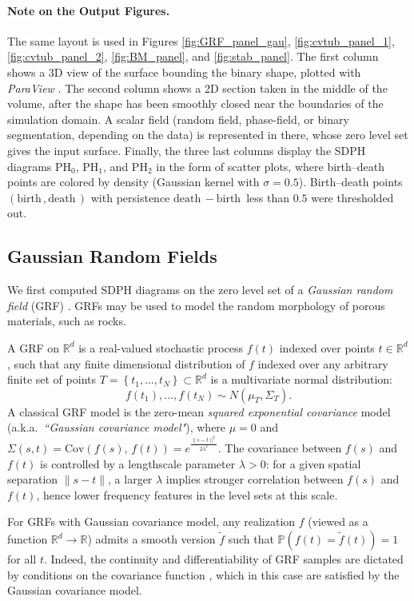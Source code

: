\documentclass[11pt]{article}
\newcommand{\R}{\mathbb{R}}
\newcommand{\PH}{\mathrm{PH}}
\newcommand{\birth}{\mathrm{birth} \,}
\newcommand{\death}{\mathrm{death} \,}
\theoremstyle{plain}
\theoremstyle{definition}
\theoremstyle{remark}
\begin{document}
\paragraph{Note on the Output Figures.}
The same layout is used in Figures \ref{fig:GRF_panel_gau}, \ref{fig:cvtub_panel_1}, \ref{fig:cvtub_panel_2}, \ref{fig:BM_panel}, and \ref{fig:stab_panel}.
The first column shows a 3D view of the surface bounding the binary shape, plotted with \textit{ParaView} \citep{ayachit_paraview_2015}. The second column shows a 2D section taken in the middle of the volume, after the shape has been smoothly closed near the boundaries of the simulation domain. A scalar field (random field, phase-field, or binary segmentation, depending on the data) is represented in there, whose zero level set gives the input surface. Finally, the three last columns display the SDPH diagrams $\PH_0$, $\PH_1$, and $\PH_2$ in the form of scatter plots, where birth--death points are colored by density (Gaussian kernel with $\sigma = 0.5$). Birth--death points $(\birth,\death)$ with persistence $\death - \birth$ less than $0.5$ were thresholded out.

\subsection{Gaussian Random Fields}
\label{sec:GRF_applis}
We first computed SDPH diagrams on the zero level set of a \textit{Gaussian random field} (GRF) \citep{adler_geometry_2010, gaetan_spatial_2010}. GRFs may be used to model the random morphology of porous materials, such as rocks.

A GRF on $\mathbb{R}^d$ is a real-valued stochastic process $f(t)$ indexed over points $t \in \mathbb{R}^d$, such that any finite dimensional distribution of $f$ indexed over any arbitrary finite set of points $T = \left\{t_1, \ldots, t_N\right\} \subset \mathbb{R}^d$ is a multivariate normal distribution:
$$f(t_1), \ldots, f(t_N) \sim N(\mu_T, \Sigma_{T}).$$
A classical GRF model is the zero-mean \emph{squared exponential covariance} model (a.k.a.~\textit{``Gaussian covariance model"}), where $\mu = 0$ and $\Sigma(s,t) = \mathrm{Cov}\left(f(s),\, f(t)\right) = e^{\frac{\|s-t\|^2}{2\lambda^2}}.$
The covariance between $f(s)$ and $f(t)$ is controlled by a lengthscale parameter $\lambda > 0$: for a given spatial separation $\| s-t \|$, a larger $\lambda$ implies stronger correlation between $f(s)$ and $f(t)$, hence lower frequency features in the level sets at this scale.

For GRFs with Gaussian covariance model, any realization $f$ (viewed as a function $\R^d \to \R$) admits a smooth version $\tilde{f}$ such that $\mathbb{P}(f(t) = \tilde{f}(t)) = 1$ for all $t$. Indeed, the continuity and differentiability of GRF samples are dictated by conditions on the covariance function \citep[Theorem 3.4.1]{adler_geometry_2010}, which in this case are satisfied by the Gaussian covariance model.
\end{document}
